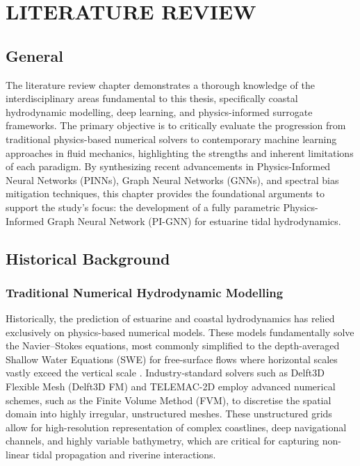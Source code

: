 \chapter{LITERATURE REVIEW}

\section{General}

The literature review chapter demonstrates a thorough knowledge of the interdisciplinary areas fundamental to this thesis, specifically coastal hydrodynamic modelling, deep learning, and physics-informed surrogate frameworks. The primary objective is to critically evaluate the progression from traditional physics-based numerical solvers to contemporary machine learning approaches in fluid mechanics, highlighting the strengths and inherent limitations of each paradigm. By synthesizing recent advancements in Physics-Informed Neural Networks (PINNs), Graph Neural Networks (GNNs), and spectral bias mitigation techniques, this chapter provides the foundational arguments to support the study's focus: the development of a fully parametric Physics-Informed Graph Neural Network (PI-GNN) for estuarine tidal hydrodynamics. 

\section{Historical Background}

\subsection{Traditional Numerical Hydrodynamic Modelling}

Historically, the prediction of estuarine and coastal hydrodynamics has relied exclusively on physics-based numerical models. These models fundamentally solve the Navier--Stokes equations, most commonly simplified to the depth-averaged Shallow Water Equations (SWE) for free-surface flows where horizontal scales vastly exceed the vertical scale \cite{Leveque2002}. Industry-standard solvers such as Delft3D Flexible Mesh (Delft3D FM) \cite{Delft3DFM2011} and TELEMAC-2D \cite{Hervouet2000} employ advanced numerical schemes, such as the Finite Volume Method (FVM), to discretise the spatial domain into highly irregular, unstructured meshes. These unstructured grids allow for high-resolution representation of complex coastlines, deep navigational channels, and highly variable bathymetry, which are critical for capturing non-linear tidal propagation and riverine interactions. 

